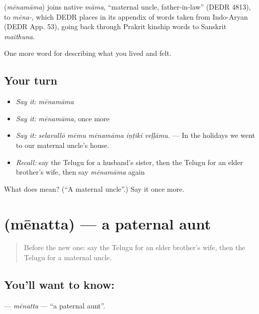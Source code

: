 \begin{cousinweb}
\textbf{} (\emph{mēnamāma}) joins native \emph{māma}, \textquotedblleft{}maternal uncle, father-in-law\textquotedblright{} (DEDR 4813), to \emph{mēna-}, which DEDR places in its appendix of words taken from Indo-Aryan (DEDR App. 53), going back through Prakrit kinship words to Sanskrit \emph{maithuna}.
\end{cousinweb}

\begin{grammarlens}[title={What you've built}]
One more word for describing what you lived and felt.
\end{grammarlens}

\subsection*{Your turn}
\begin{itemize}
\raggedright
  \item \emph{Say it:} \emph{mēnamāma}
  \item \emph{Say it:} \emph{mēnamāma}, once more
  \item \emph{Say it:} \emph{selavullō mēmu mēnamāma iṇṭiki veḷḷāmu.} — In the holidays we went to our maternal uncle's house.
  \item \emph{Recall:} say the Telugu for a husband's sister, then the Telugu for an elder brother's wife, then say \emph{mēnamāma} again
\end{itemize}

\begin{tcolorbox}[breakable,colback=teal!4,colframe=teal!35!black,title={Before you move on}]
What does  mean? (\textquotedblleft{}A maternal uncle\textquotedblright{}.) Say it once more.
\end{tcolorbox}
\section[\texorpdfstring{\te{మేనత్త} (mēnatta)}{మేనత్త (mēnatta)}]{ (mēnatta) — a paternal aunt}

\label{lesson:TE-C529-menatta}



\begin{quote}
Before the new one: say the Telugu for an elder brother's wife, then the Telugu for a maternal uncle.
\end{quote}

\subsection*{You'll want to know: }
\textbf{} — \emph{mēnatta} — \textquotedblleft{}a paternal aunt\textquotedblright{}.

